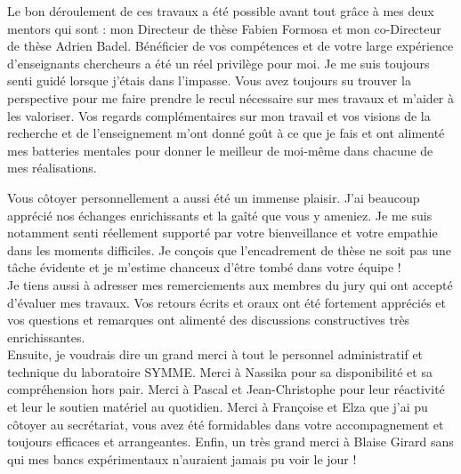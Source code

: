 Le bon déroulement de ces travaux a été possible avant tout grâce à mes deux mentors qui sont : mon Directeur de thèse Fabien Formosa et mon co-Directeur de thèse Adrien Badel. Bénéficier de vos compétences et de votre large expérience d'enseignants chercheurs a été un réel privilège pour moi. Je me suis toujours senti guidé lorsque j'étais dans l'impasse. Vous avez toujours su trouver la perspective pour me faire prendre le recul nécessaire sur mes travaux et m'aider à les valoriser. Vos regards complémentaires sur mon travail et vos visions de la recherche et de l'enseignement m'ont donné goût à ce que je fais et ont alimenté mes batteries mentales pour donner le meilleur de moi-même dans chacune de mes réalisations.

Vous côtoyer personnellement a aussi été un immense plaisir. J'ai beaucoup apprécié nos échanges enrichissants et la gaîté que vous y ameniez. Je me suis notamment senti réellement supporté par votre bienveillance et votre empathie dans les moments difficiles. Je conçois que l'encadrement de thèse ne soit pas une tâche évidente et je m'estime chanceux d'être tombé dans votre équipe !\\

Je tiens aussi à adresser mes remerciements aux membres du jury qui ont accepté d'évaluer mes travaux. Vos retours écrits et oraux ont été fortement appréciés et vos questions et remarques ont alimenté des discussions constructives très enrichissantes. \\

Ensuite, je voudrais dire un grand merci à tout le personnel administratif et technique du laboratoire SYMME. Merci à Nassika pour sa disponibilité et sa compréhension hors pair. Merci à Pascal et Jean-Christophe pour leur réactivité et leur le soutien matériel au quotidien. Merci à Françoise et Elza que j'ai pu côtoyer au secrétariat, vous avez été formidables dans votre accompagnement et toujours efficaces et arrangeantes. Enfin, un très grand merci à Blaise Girard sans qui mes bancs expérimentaux n'auraient jamais pu voir le jour !